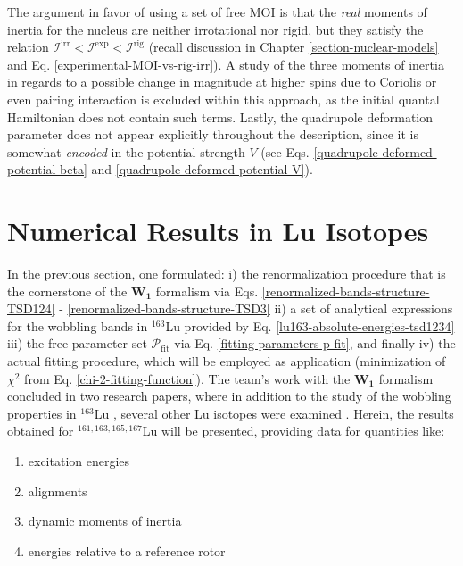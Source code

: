 The argument in favor of using a set of free MOI is that the \emph{real} moments of inertia for the nucleus are neither irrotational nor rigid, but they satisfy the relation $\mathcal{I}^\text{irr}<\mathcal{I}^\text{exp}<\mathcal{I}^\text{rig}$ (recall discussion in Chapter \ref{section-nuclear-models} and Eq. \ref{experimental-MOI-vs-rig-irr}). A study of the three moments of inertia in regards to a possible change in magnitude at higher spins due to Coriolis or even pairing interaction is excluded within this approach, as the initial quantal Hamiltonian does not contain such terms. Lastly, the quadrupole deformation parameter does not appear explicitly throughout the description, since it is somewhat \emph{encoded} in the potential strength $V$ (see Eqs. \ref{quadrupole-deformed-potential-beta} and \ref{quadrupole-deformed-potential-V}).

\section{Numerical Results in Lu Isotopes}

In the previous section, one formulated: i) the renormalization procedure that is the cornerstone of the $\mathbf{W_1}$ formalism via Eqs. \ref{renormalized-bands-structure-TSD124} - \ref{renormalized-bands-structure-TSD3} ii) a set of analytical expressions for the wobbling bands in $^{163}$Lu provided by Eq. \ref{lu163-absolute-energies-tsd1234} iii) the free parameter set $\mathcal{P}_\text{fit}$ via Eq. \ref{fitting-parameters-p-fit}, and finally iv) the actual fitting procedure, which will be employed as application (minimization of $\chi^2$ from Eq. \ref{chi-2-fitting-function}). The team's work with the $\mathbf{W_1}$ formalism concluded in two research papers, where in addition to the study of the wobbling properties in $^{163}$Lu \cite{raduta2020towards}, several other Lu isotopes were examined \cite{raduta2020approach}. Herein, the results obtained for $^{161,163,165,167}$Lu will be presented, providing data for quantities like:
\begin{enumerate}
    \item excitation energies
    \item alignments
    \item dynamic moments of inertia
    \item energies relative to a reference rotor
\end{enumerate}

